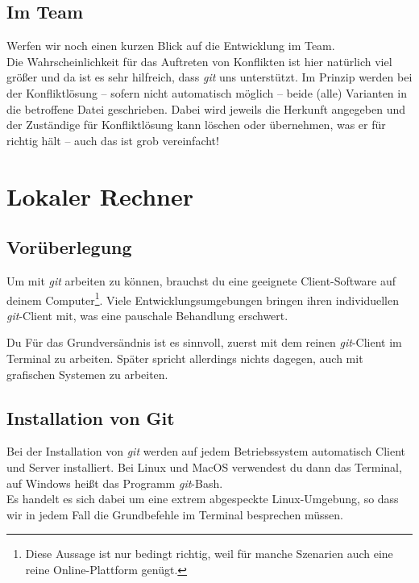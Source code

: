 \documentclass[
  letterpaper,
  DIV=11]{scrreprt}
\newcommand{\git}{\textit{git}\xspace}
\begin{document}
\section{Im Team}\label{im-team}

Werfen wir noch einen kurzen Blick auf die Entwicklung im Team.\\
Die Wahrscheinlichkeit für das Auftreten von Konflikten ist hier
natürlich viel größer und da ist es sehr hilfreich, dass \git uns
unterstützt. Im Prinzip werden bei der Konfliktlösung -- sofern nicht
automatisch möglich -- beide (alle) Varianten in die betroffene Datei
geschrieben. Dabei wird jeweils die Herkunft angegeben und der
Zuständige für Konfliktlösung kann löschen oder übernehmen, was er für
richtig hält -- auch das ist grob vereinfacht!


\chapter{Lokaler Rechner}\label{lokaler-rechner}

\section{Vorüberlegung}\label{voruxfcberlegung}

Um mit \git arbeiten zu können, brauchst du eine geeignete
Client-Software auf deinem Computer\footnote{Diese Aussage ist nur
  bedingt richtig, weil für manche Szenarien auch eine reine
  Online-Plattform genügt.}. Viele Entwicklungsumgebungen bringen ihren
individuellen \git-Client mit, was eine pauschale Behandlung erschwert.

Du Für das Grundversändnis ist es sinnvoll, zuerst mit dem reinen
\git-Client im Terminal zu arbeiten. Später spricht allerdings nichts
dagegen, auch mit grafischen Systemen zu arbeiten.

\section{Installation von Git}\label{installation-von-git}

Bei der Installation von \git werden auf jedem Betriebssystem
automatisch Client und Server installiert. Bei Linux und MacOS
verwendest du dann das Terminal, auf Windows heißt das Programm
\git-Bash.\\
Es handelt es sich dabei um eine extrem abgespeckte Linux-Umgebung, so
dass wir in jedem Fall die Grundbefehle im Terminal besprechen müssen.
\end{document}
